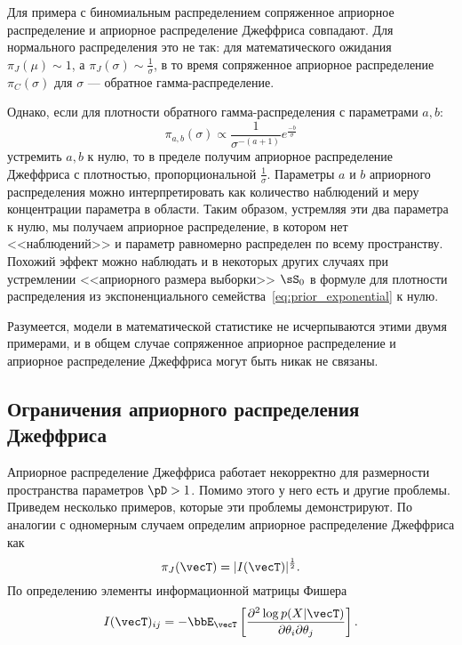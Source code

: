 Для примера с биномиальным распределением сопряженное априорное распределение и априорное распределение Джеффриса совпадают.
Для нормального распределения это не так: для математического ожидания $\pi_J(\mu) \sim 1$, а $\pi_J(\sigma) \sim \frac{1}{\sigma}$,
в то время сопряженное априорное распределение $\pi_C(\sigma)$ для $\sigma$ --- обратное гамма-распределение.

Однако, если для плотности обратного гамма-распределения с параметрами $a, b$:
\[
\pi_{a, b}(\sigma) \propto \frac1{\sigma^{-(a + 1)}} e^{\frac{-b}{\sigma}}
\]
устремить $a, b$ к нулю, то в пределе получим априорное распределение Джеффриса с плотностью, пропорциональной $\frac{1}{\sigma}$.
Параметры $a$ и $b$ априорного распределения можно интерпретировать как количество наблюдений и меру концентрации параметра в области.
Таким образом, устремляя эти два параметра к нулю, мы получаем априорное распределение, в котором нет <<наблюдений>> и параметр равномерно распределен по всему пространству.
Похожий эффект можно наблюдать и в некоторых других случаях при устремлении <<априорного размера выборки>> $\sS_0$ в формуле для плотности распределения из экспоненциального семейства~\eqref{eq:prior_exponential} к нулю.

Разумеется, модели в математической статистике не исчерпываются этими двумя примерами, и в общем случае сопряженное априорное распределение и априорное распределение Джеффриса могут быть никак не связаны.

\subsection{Ограничения априорного распределения Джеффриса}

Априорное распределение Джеффриса работает некорректно для размерности пространства параметров $\pD > 1$.
Помимо этого у него есть и другие проблемы. 
Приведем несколько примеров, которые эти проблемы демонстрируют.
По аналогии с одномерным случаем определим априорное распределение Джеффриса как 
\[
\pi_J(\vecT) = |I(\vecT)|^{\frac12}.
\]
По определению элементы информационной матрицы Фишера
\[
I(\vecT)_{ij} = -\bbE_{\vecT} \left[ \frac{\partial^2 \log p(X | \vecT)}{\partial \theta_i \partial \theta_j} \right].
\]


